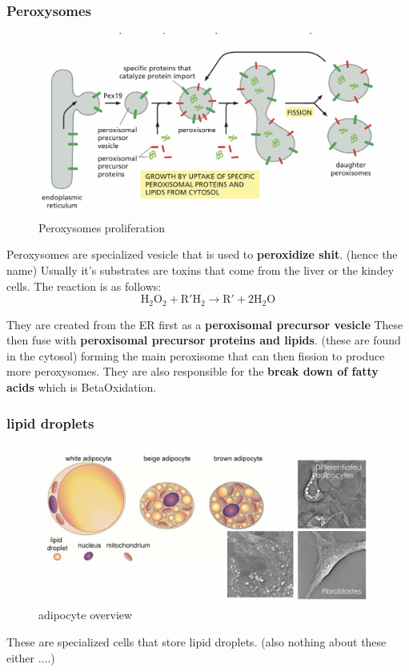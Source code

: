 \documentclass[../main.tex]{subfiles}
\begin{document}
\subsubsection{Peroxysomes}
\begin{figure}[H]
    \centering
    \includegraphics[width=0.5\linewidth]{Sum_Cell_Bio_II//lectures//cbII4/Peroxy.png}
    \caption{Peroxysomes proliferation}
    \label{fig:enter-label}
\end{figure}
Peroxysomes are specialized vesicle that is used to \textbf{peroxidize shit}. (hence the name) Usually it's substrates are toxins that come from the liver or the kindey cells. The reaction is as follows:
\begin{equation}
\mathrm{H_2O_2} + \mathrm{R'H_2} \rightarrow \mathrm{R'} + 2\mathrm{H_2O}
\end{equation}

They are created from the ER first as a \textbf{peroxisomal precursor vesicle} These then fuse with \textbf{peroxisomal precursor proteins and lipids}. (these are found in the cytosol) forming the main peroxisome that can then fission to produce more peroxysomes. They are also responsible for the \textbf{break down of fatty acids} which is \gls{BetaOxidation}. 


\subsubsection{lipid droplets}
\begin{figure}[H]
    \centering
    \includegraphics[width=0.5\linewidth]{Sum_Cell_Bio_II//lectures//cbII4/fatCells.png}
    \caption{adipocyte overview}
    \label{fig:enter-label}
\end{figure}

These are specialized cells that store lipid droplets. (also nothing about these either ....)
\end{document}

